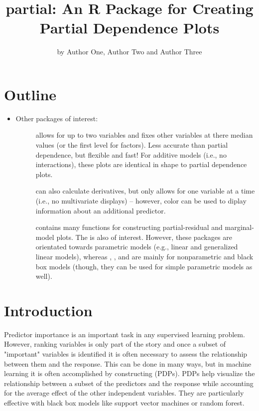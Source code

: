
\title{partial: An R Package for Creating Partial Dependence Plots}
\author{by Author One, Author Two and Author Three}

\maketitle



\section{Outline}

\begin{itemize}
  \item Other packages of interest: 
  \begin{description}
    \item[] allows for up to two variables and fixes other variables at there median values (or the first level for factors). Less accurate than partial dependence, but flexible and fast! For additive models (i.e., no interactions), these plots are identical in shape to partial dependence plots.
    \item[] can also calculate derivatives, but only allows for one variable at a time (i.e., no multivariate displays) -- however, color can be used to diplay information about an additional predictor.
    \item[] contains many functions for constructing partial-residual and marginal-model plots. The  is also of interest. However, these packages are orientated towards parametric models (e.g., linear and generalized linear models), whereas , , and  are mainly for nonparametric and black box models (though, they can be used for simple parametric models as well).
  \end{description}
\end{itemize}


\section{Introduction}

Predictor importance is an important task in any supervised learning problem. However, ranking variables is only part of the story and once a subset of "important" variables is identified it is often necessary to assess the relationship between them and the response. This can be done in many ways, but in machine learning it is often accomplished by constructing  (PDPs). PDPs help visualize the relationship between a subset of the predictors and the response while accounting for the average effect of the other independent variables. They are particularly effective with black box models like support vector machines or random forest.

